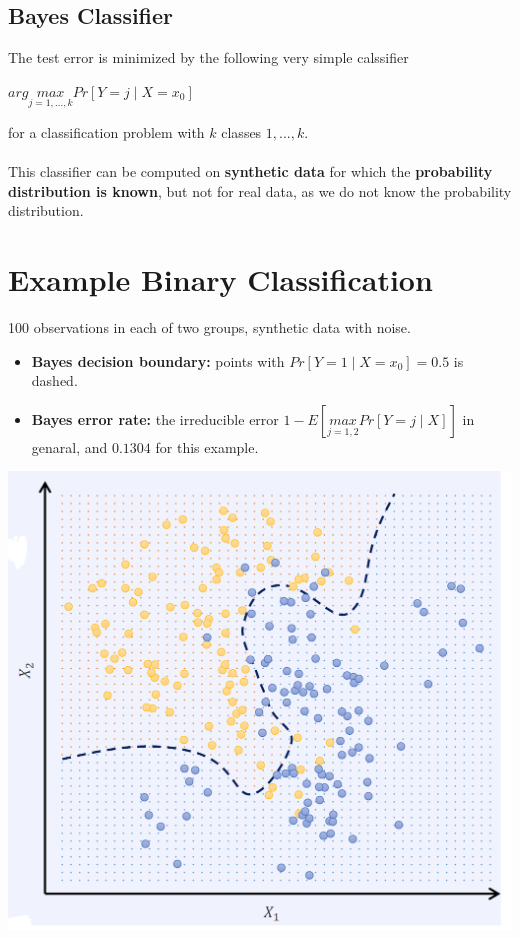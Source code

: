 		\subsection{Bayes Classifier}
			The test error is minimized by the following very simple calssifier
			\begin{center}
				$arg \underset{j=1,...,k}{max} Pr[Y=j \mid X=x_0]$
			\end{center}
			for a classification problem with $k$ classes $1,...,k$.\\\\
			This classifier can be computed on \textbf{synthetic data} for which the \textbf{probability distribution is known}, but not for real data, 
			as we do not know the probability distribution.

	\section{Example Binary Classification}
			100 observations in each of two groups, synthetic data with noise.
			\begin{itemize}
				\item \textbf{Bayes decision boundary:} points with $Pr[Y=1 \mid X=x_0] = 0.5$ is dashed.
				\item \textbf{Bayes error rate:} the irreducible error $1 - E[\underset{j=1,2}{max} Pr[Y=j \mid X]]$ in genaral, and $0.1304$ for this example.
			\end{itemize}
			\includegraphics[width=1\linewidth]{Graphics/Introduction/11.png}
\newpage		
